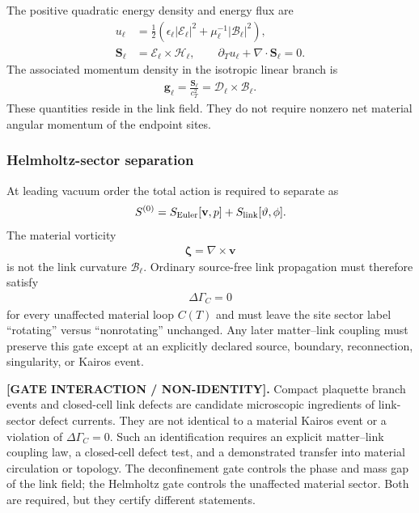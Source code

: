 The positive quadratic energy density and energy flux are
\begin{align}
    u_\ell
    &=
    \frac12
    \left(
        \epsilon_\ell|\boldsymbol{\mathcal E}_\ell|^2
        +
        \mu_\ell^{-1}|\boldsymbol{\mathcal B}_\ell|^2
    \right),
    \\
    \mathbf S_\ell
    &=
    \boldsymbol{\mathcal E}_\ell
    \times
    \boldsymbol{\mathcal H}_\ell,
    \qquad
    \partial_Tu_\ell+\nabla\cdot\mathbf S_\ell=0.
    \label{eq:rt_link_energy_flux}
\end{align}
The associated momentum density in the isotropic linear branch is
\begin{align}
    \mathbf g_\ell
    =
    \frac{\mathbf S_\ell}{c_T^2}
    =
    \boldsymbol{\mathcal D}_\ell
    \times
    \boldsymbol{\mathcal B}_\ell.
    \label{eq:rt_link_momentum_density}
\end{align}
These quantities reside in the link field.  They do not require nonzero net
material angular momentum of the endpoint sites.

\subsubsection{Helmholtz-sector separation}

At leading vacuum order the total action is required to separate as
\begin{align}
    S^{(0)}
    =
    S_{\rm Euler}[\mathbf v,p]
    +
    S_{\rm link}[\vartheta,\phi].
    \label{eq:rt_link_euler_factorization}
\end{align}
The material vorticity
\begin{align}
    \boldsymbol\zeta=\nabla\times\mathbf v
\end{align}
is not the link curvature
$\boldsymbol{\mathcal B}_\ell$.  Ordinary source-free link propagation must
therefore satisfy
\begin{align}
    \Delta\Gamma_C=0
\end{align}
for every unaffected material loop $C(T)$ and must leave the site sector label
``rotating'' versus ``nonrotating'' unchanged.  Any later matter--link coupling
must preserve this gate except at an explicitly declared source, boundary,
reconnection, singularity, or Kairos event.

\textbf{[GATE INTERACTION / NON-IDENTITY].}
Compact plaquette branch events and closed-cell link defects are candidate
microscopic ingredients of link-sector defect currents.  They are not identical
to a material Kairos event or a violation of \(\Delta\Gamma_C=0\).  Such an
identification requires an explicit matter--link coupling law, a closed-cell
defect test, and a demonstrated transfer into material circulation or topology.
The deconfinement gate controls the phase and mass gap of the link field; the
Helmholtz gate controls the unaffected material sector.  Both are required, but
they certify different statements.

